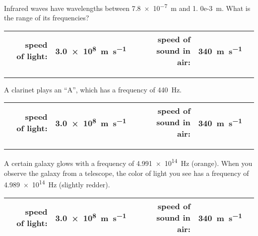 \documentclass[12pt]{exam}
\begin{document}
\newcommand{\speeds}
{\begin{center}
  \renewcommand{\arraystretch}{2}
  \begin{tabular}{|crlc|crlc|}
    \hline
     & speed of light: & \SI{3.0e8}{\meter\per\second} & &
     & speed of sound in air: & \SI{340}{\meter\per\second} &
    \\\hline
  \end{tabular}
\end{center}}

\begin{questions}

  \Large

\question
  Infrared waves have wavelengths between \SI{7.8e-7}{\meter} and \SI{1.
  0e-3}{\meter}.  What is the range of its frequencies?

  \speeds

  \vs\hrule\vs

\question
  A clarinet plays an ``A'', which has a frequency of 440~Hz.  

  
  \speeds
  
  \vs\hrule\vs


  
\question
  A certain galaxy glows with a frequency of \SI{4.991e14}{\hertz} (orange).  When you observe the galaxy from a telescope, the color of light you see has a frequency of \SI{4.989e14}{\hertz} (slightly redder).

  

  \speeds

  
  
  
  
  
  
  
  
\end{questions}
\end{document}
